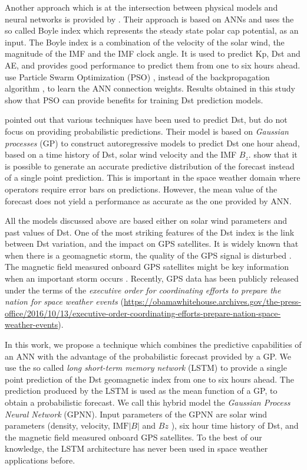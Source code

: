 Another approach which is at the intersection between physical models and neural networks is provided by 
\citet{Bala2012}. Their approach is based on ANNs and uses the so called Boyle index which represents 
the steady state polar cap potential, as an input. The Boyle index is a combination of the velocity of 
the solar wind, the magnitude of the IMF and the IMF clock angle. It is used to predict Kp, Dst and AE, 
and provides good performance to predict them from one to six hours ahead. \citet{Lazzus} use 
Particle Swarm Optimization (PSO) \citep{eberhart1995new}, instead of the backpropagation algorithm 
\citep{rummelhart1986parallel}, to learn the ANN connection weights. Results obtained in this study show 
that PSO can provide benefits for training Dst prediction models.

\citet{ChandorkarDst} pointed out that various techniques have been used to predict Dst, but do not 
focus on providing probabilistic predictions. Their model is based on \emph{Gaussian processes} (GP) to construct 
autoregressive models to predict Dst one hour ahead, based on a time history of Dst, solar wind velocity and 
the IMF $B_z$. \citet{ChandorkarDst} show that it is possible to generate an accurate predictive distribution 
of the forecast instead of a single point prediction. This is important in the space weather domain where 
operators require error bars on predictions. However, the mean value of the forecast does not yield a 
performance as accurate as the one provided by ANN. 

All the models discussed above are based either on solar wind parameters and past values of Dst. One of the most 
striking features of the Dst index is the link between Dst variation, and the impact on GPS satellites. 
It is widely known that when there is a geomagnetic storm, the quality of the GPS signal is disturbed 
\citep{astafyeva2014geomagnetic}. The magnetic field measured onboard GPS satellites might be key information 
when an important storm occurs \citep{morley2017energetic}. Recently, GPS data has been publicly released under 
the terms of the \emph{executive order for coordinating efforts to prepare the nation for space weather events} 
(\url{https://obamawhitehouse.archives.gov/the-press-office/2016/10/13/executive-order-coordinating-efforts-prepare-nation-space-weather-events}). 

In this work, we propose a technique which combines the predictive capabilities of an ANN with the advantage of the 
probabilistic forecast provided by a GP. We use the so called \emph{long short-term memory network} (LSTM) 
\citep{hochreiter1997long} to provide a single point prediction of the Dst geomagnetic index from one to six 
hours ahead. The prediction produced by the LSTM is used as the mean function of a GP, to obtain a 
probabilistic forecast. We call this hybrid model the \emph{Gaussian Process Neural Network} (GPNN). 
Input parameters of the GPNN are solar wind parameters (density, velocity,  
\( \text{IMF}  \vert B \vert  \)  and \(  Bz \) ), six hour time history of Dst, and the magnetic field 
measured onboard GPS satellites. To the best of our knowledge, the LSTM architecture has never 
been used in space weather applications before.

